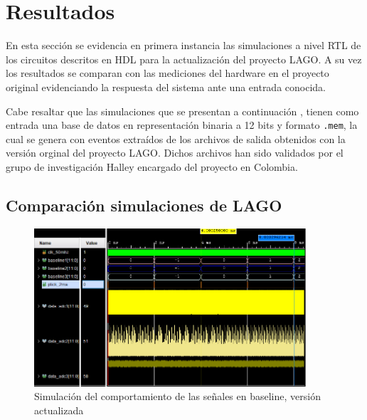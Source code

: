 
\chapter{Resultados}

En esta sección se evidencia en primera instancia las simulaciones a nivel RTL de los circuitos descritos en HDL para la actualización del proyecto LAGO. A su vez  los resultados se comparan con las mediciones del hardware en el proyecto original evidenciando la respuesta del sistema ante una entrada conocida. 

Cabe resaltar que las simulaciones que se presentan a continuación , tienen como entrada una base de datos en representación binaria a 12 bits y formato \texttt{.mem}, la cual se genera con eventos extraídos de los archivos de salida obtenidos con la versión orginal del proyecto LAGO.
Dichos archivos han sido validados por el grupo de investigación Halley encargado del proyecto en Colombia.

\section{\textbf{Comparación simulaciones de LAGO}}

\begin{figure}[H]
\includegraphics[width=0.9\textwidth]{Figs/actualbase.PNG} 
\centering
\caption{Simulación del comportamiento de las señales en baseline, versión actualizada}
\label{sim2ms}
\end{figure}

